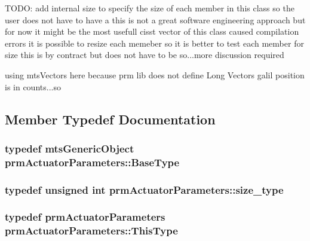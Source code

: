 T\-O\-D\-O\-: add internal size to specify the size of each member in this class so the user does not have to have a this is not a great software engineering approach but for now it might be the most usefull cisst vector of this class caused compilation errors it is possible to resize each memeber so it is better to test each member for size this is by contract but does not have to be so...more discussion required

using mts\-Vectors here because prm lib does not define Long Vectors galil position is in counts...so 

\subsection{Member Typedef Documentation}
\hypertarget{classprm_actuator_parameters_a9e63e124dcab41543b0bdcd0a652671b}{
\subsubsection[{Base\-Type}]{\setlength{\rightskip}{0pt plus 5cm}typedef {\bf mts\-Generic\-Object} {\bf prm\-Actuator\-Parameters\-::\-Base\-Type}}}\label{classprm_actuator_parameters_a9e63e124dcab41543b0bdcd0a652671b}
\hypertarget{classprm_actuator_parameters_a0b8bdcb6c28e1f3028d93cf9b6ca1ee0}{
\subsubsection[{size\-\_\-type}]{\setlength{\rightskip}{0pt plus 5cm}typedef unsigned int {\bf prm\-Actuator\-Parameters\-::size\-\_\-type}}}\label{classprm_actuator_parameters_a0b8bdcb6c28e1f3028d93cf9b6ca1ee0}
\hypertarget{classprm_actuator_parameters_a589f0647003ec5c96825d45d645baa49}{
\subsubsection[{This\-Type}]{\setlength{\rightskip}{0pt plus 5cm}typedef {\bf prm\-Actuator\-Parameters} {\bf prm\-Actuator\-Parameters\-::\-This\-Type}}}\label{classprm_actuator_parameters_a589f0647003ec5c96825d45d645baa49}


